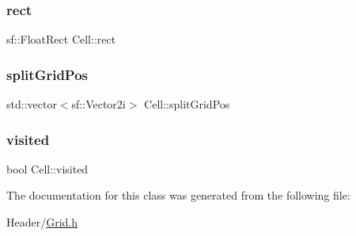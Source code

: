 \mbox{\label{class_cell_a9caa7beb50cd41653973716195a28061}} 
\subsubsection{\texorpdfstring{rect}{rect}}
{\footnotesize\ttfamily sf\+::\+Float\+Rect Cell\+::rect}

\mbox{\label{class_cell_aa84384a1a569adb1f7391786ec2c71e7}} 
\subsubsection{\texorpdfstring{splitGridPos}{splitGridPos}}
{\footnotesize\ttfamily std\+::vector$<$sf\+::\+Vector2i$>$ Cell\+::split\+Grid\+Pos}

\mbox{\label{class_cell_ac0fdf52adc7d9dd8c5de95635ff04de3}} 
\subsubsection{\texorpdfstring{visited}{visited}}
{\footnotesize\ttfamily bool Cell\+::visited}



The documentation for this class was generated from the following file\+:\begin{DoxyCompactItemize}
\item 
Header/\mbox{\hyperlink{_grid_8h}{Grid.\+h}}\end{DoxyCompactItemize}
